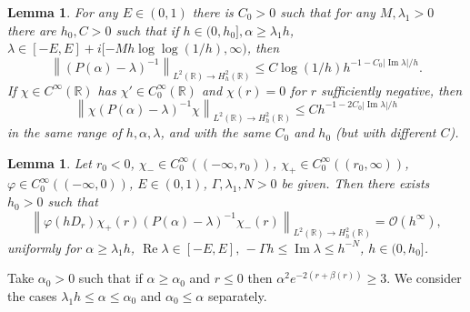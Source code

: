 \documentclass[reqno, 12pt]{amsart}
\newcommand \R {\mathbb{R}}
\newcommand \Oh {\mathcal{O}}
\DeclareMathOperator \re {Re}
\DeclareMathOperator \im {Im}
\newtheorem{lem}[prop]{Lemma}
\theoremstyle{definition}
\numberwithin{equation}{section}
\numberwithin{prop}{section}
\numberwithin{figure}{section}
\begin{document}
\begin{lem}\label{l:modelbound}
For any $E \in (0,1)$ there is $C_0>0$ such that for any $M, \lambda_1>0$ there are $h_0,C>0$  such that if $h \in (0,h_0], \alpha \ge \lambda_1 h$, $\lambda \in [-E,E] +i [-Mh\log\log(1/h),\infty)$, then
\begin{equation}\label{e:modelbound2}
\left\|(P(\alpha) - \lambda)^{-1}\right\|_{L^2(\R) \to H^2_h(\R)} \le C \log(1/h) h^{-1-C_0 |\im \lambda| /h}. \end{equation}
If $\chi \in C^\infty(\R)$ has $\chi' \in C_0^\infty(\R)$ and $\chi(r) = 0$ for $r$ sufficiently negative, then
\begin{equation}\label{e:modelbound2b}
\left\|\chi(P(\alpha) - \lambda)^{-1}\chi\right\|_{L^2(\R) \to H^2_h(\R)} \le C h^{-1-2C_0 |\im \lambda| /h}\end{equation}
in the same range of $h,\alpha,\lambda$, and with the same $C_0$ and $h_0$ (but with different $C$).
\end{lem}

\begin{lem}
Let $r_0 <0$, $\chi_- \in C_0^\infty((-\infty,r_0))$, $\chi_+ \in C_0^\infty((r_0,\infty))$, $\varphi \in C_0^\infty((-\infty,0))$, $E \in (0,1)$, $\Gamma, \lambda_1, N>0$ be given. Then there exists $h_0>0$ such that
\begin{equation}\label{e:modelpropa}
\left\|\varphi(hD_r)\chi_+(r)(P(\alpha) - \lambda)^{-1}\chi_-(r)\right\|_{L^2(\R) \to H^2_h(\R)} = \Oh(h^\infty),
\end{equation}
uniformly for $\alpha \ge \lambda_1 h$, $\re \lambda \in [-E,E], \, -\Gamma h \le \im \lambda \le h^{-N}$, $h \in (0,h_0]$.
\end{lem}

Take $\alpha_0>0$ such that if $\alpha \ge \alpha_0$ and $r \le 0$ then $\alpha^2e^{-2(r+\beta(r))} \ge 3$.
We consider the cases $\lambda_1 h \le \alpha \le \alpha_0$ and $\alpha_0 \le \alpha$ separately.
\end{document}
